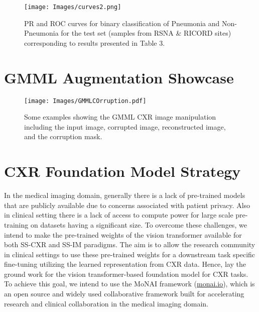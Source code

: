 \documentclass[10pt,journal,compsoc]{IEEEtran}
\begin{document}
\begin{figure*}[ht]
\begin{center}  
\texttt{[image: Images/curves2.png]}
\end{center}
\caption{PR and ROC curves for binary classification of Pneumonia and Non-Pneumonia for the test set (samples from RSNA \& RICORD sites) corresponding to results presented in Table 3.}
\label{fig:segmentation3}
\end{figure*}


\clearpage
\section{GMML Augmentation Showcase}\label{section:appendix-roc}
\begin{figure*}[ht]
    \centering
    \texttt{[image: Images/GMMLCOrruption.pdf]}
    \caption{Some examples showing the GMML CXR image manipulation including the input image, corrupted image, reconstructed image, and the corruption mask.}
    \label{fig:GMMLmani}
\end{figure*}

\clearpage
\section{CXR Foundation Model Strategy}\label{section:appendix-roc2}
In the medical imaging domain, generally there is a lack of pre-trained models that are publicly available due to concerns associated with patient privacy. Also in clinical setting there is a lack of access to compute power for large scale pre-training on datasets having a significant size. To overcome these challenges, we intend to make the pre-trained weights of the vision transformer available for both SS-CXR and SS-IM paradigms. The aim is to allow the research community in clinical settings to use these pre-trained weights for a downstream task specific fine-tuning utilizing the learned representation from CXR data. Hence, lay the ground work for the vision transformer-based foundation model for CXR tasks. To achieve this goal, we intend to use the MoNAI framework (\url{monai.io}), which is an open source and widely used collaborative framework  built for accelerating research and clinical collaboration in the medical imaging domain.
\end{document}
